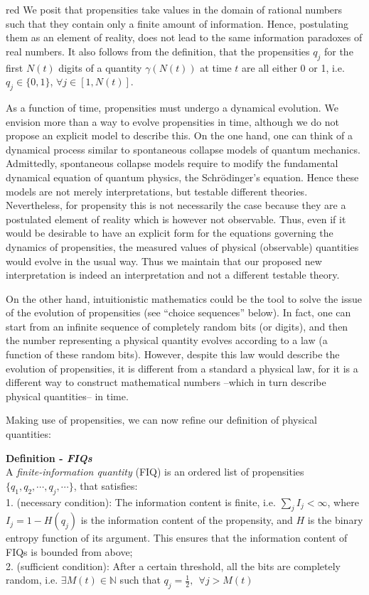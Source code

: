 \documentclass[12pt]{article}
\newcommand{\N}{\mathbb{N}}
\begin{document}
{red}{ We posit that propensities take values in the domain of rational numbers such that they contain only a finite amount of information. Hence, postulating them as an element of reality, does not lead to the same information paradoxes of real numbers.} It also follows from the definition, that the propensities $q_j$ for the first $N(t)$ digits of a quantity $\gamma(N(t))$ at time $t$ are all either 0 or 1, i.e. $q_j\in\{0,1\}$, $\forall j\in[1,N(t)]$.

As a function of time, propensities must undergo a dynamical evolution. We envision more than a way to evolve propensities in time, although we do not propose an explicit model to describe this. On the one hand, one can think of a dynamical process similar to spontaneous collapse models of quantum mechanics. Admittedly, spontaneous collapse models require to modify the fundamental dynamical equation of quantum physics, the Schr{\"o}dinger's equation. Hence these models are not merely interpretations, but testable different theories. Nevertheless, for propensity this is not necessarily the case because they are a postulated element of reality which is however not observable. Thus, even if it would be desirable to have an explicit form for the equations governing the dynamics of propensities, the measured values of physical (observable) quantities would evolve in the usual way. Thus we maintain that our proposed new interpretation is indeed an interpretation and not a different testable theory.

On the other hand, intuitionistic mathematics could be the tool to solve the issue of the evolution of propensities (see ``choice sequences'' below). In fact, one can start from an infinite sequence of completely random bits (or digits), and then the number representing a physical quantity evolves according to a law (a function of these random bits). However, despite this law would describe the evolution of propensities, it is different from a standard a physical law, for it is a different way to construct mathematical numbers --which in turn describe physical quantities-- in time.

Making use of propensities, we can now refine our definition of physical quantities:

\textbf{Definition - \textit{FIQs}}\\
A \emph{finite-information quantity} (FIQ) is an ordered list of propensities $\{ q_1, q_2, \cdots , q_j, \cdots \}$, that satisfies:\\
1. (necessary condition): The information content is finite, i.e.  $\sum_j I_j < \infty$, where $I_j=1-H(q_j)$ is the information content of the propensity, and $H$ is the binary entropy function of its argument. This ensures that the information content of FIQs is bounded from above;\\
2. (sufficient condition): After a certain threshold, all the bits are completely random, i.e. $\exists M(t) \in \N$ such that $q_j = \frac{1}{2}, \ \ \forall j>M(t)$\\
\end{document}
